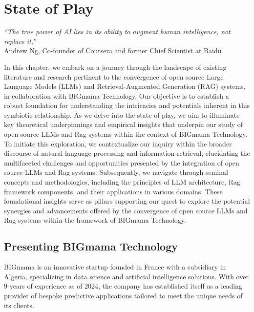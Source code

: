 \chapter{State of Play}
\graphicspath{{state-of-play/figures/}}

\begin{flushright}
    \small{\textit{``The true power of AI lies in its ability to augment human intelligence, not replace it.''}\\
        Andrew Ng, Co-founder of Coursera and former Chief Scientist at Baidu}
\end{flushright}

In this chapter, we embark on a journey through the landscape of existing literature and research pertinent to the convergence of open source Large Language Models (LLMs) and Retrieval-Augmented Generation (RAG) systems, in collaboration with BIGmama Technology. Our objective is to establish a robust foundation for understanding the intricacies and potentials inherent in this symbiotic relationship. As we delve into the state of play, we aim to illuminate key theoretical underpinnings and empirical insights that underpin our study of open source LLMs and Rag systems within the context of BIGmama Technology. To initiate this exploration, we contextualize our inquiry within the broader discourse of natural language processing and information retrieval, elucidating the multifaceted challenges and opportunities presented by the integration of open source LLMs and Rag systems. Subsequently, we navigate through seminal concepts and methodologies, including the principles of LLM architecture, Rag framework components, and their applications in various domains. These foundational insights serve as pillars supporting our quest to explore the potential synergies and advancements offered by the convergence of open source LLMs and Rag systems within the framework of BIGmama Technology.

\section{Presenting BIGmama Technology}

BIGmama is an innovative startup founded in France with a subsidiary in Algeria, specializing in data science and artificial intelligence solutions. With over 9 years of experience as of 2024, the company has established itself as a leading provider of bespoke predictive applications tailored to meet the unique needs of its clients.

